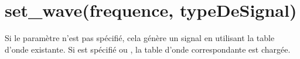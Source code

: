 \documentclass[a4paper,12pt,french]{sphinxmanual}
\begin{document}
\begin{sphinxVerbatim}[commandchars=\\\{\}]
   
 
   
\PYG{p}{[}\PYG{p}{]}\PYG{p}{[}\PYG{p}{]}        
\PYG{p}{[}\PYG{p}{]}\PYG{p}{[}\PYG{p}{]}        
\end{sphinxVerbatim}


\section{set\_wave(frequence, typeDeSignal)}
\label{\detokenize{7.1:set-wave-frequence-typedesignal}}
Si le paramètre  n’est pas spécifié, cela génère
un signal en utilisant la table d’onde existante. Si 
est spécifié  ou , la table d’onde
correspondante est chargée.
\end{document}
